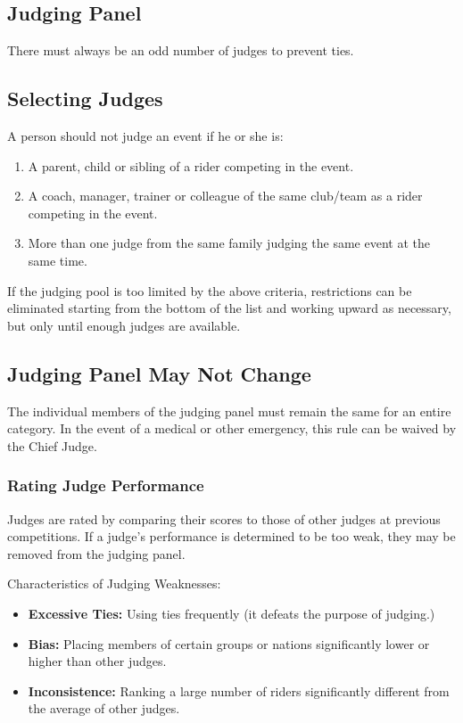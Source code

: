 \subsection{Judging Panel}

There must always be an odd number of judges to prevent ties. 

\subsection{Selecting Judges}
A person should not judge an event if he or she is:
\begin{enumerate}
\item A parent, child or sibling of a rider competing in the event.
\item A coach, manager, trainer or colleague of the same club/team as a rider competing in the event. 
\item More than one judge from the same family judging the same event at the same time.
\end{enumerate}

If the judging pool is too limited by the above criteria, restrictions can be eliminated starting from the bottom of the list and working upward as necessary, but only until enough judges are available.

\subsection{Judging Panel May Not Change}

The individual members of the judging panel must remain the same for an entire category.
In the event of a medical or other emergency, this rule can be waived by the Chief Judge.

\subsubsection{Rating Judge Performance}
Judges are rated by comparing their scores to those of other judges at previous competitions.
If a judge’s performance is determined to be too weak, they may be removed from the judging panel.

Characteristics of Judging Weaknesses:
\begin{itemize}
\item \textbf{Excessive Ties:}
Using ties frequently (it defeats the purpose of judging.)
\item \textbf{Bias:}
Placing members of certain groups or nations significantly lower or higher than other judges.
\item\textbf{Inconsistence:}
Ranking a large number of riders significantly different from the average of other judges. 
\end{itemize}

